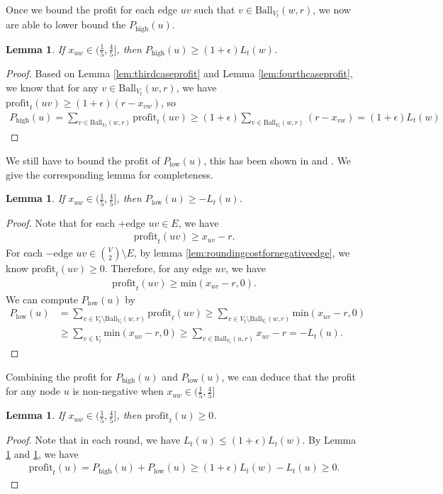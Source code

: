 \documentclass[11pt]{article}
\newtheorem{lemma}[theorem]{Lemma}
\newcommand{\ball}{\mathrm{Ball}}
\newcommand{\profit}{\mathrm{profit}}
\newcommand{\onefive}{\frac{1}{5}}
\newcommand{\fourfive}{\frac{4}{5}}
\begin{document}
\begin{CJK*}{UTF8}{gbsn}
Once we bound the profit for each edge $uv$ such that $v \in \ball_{V_t}(w, r)$, we now are able to lower bound the $P_{\textrm{high}}(u)$.

\begin{lemma}
\label{lem:highprofit}
If $x_{uw} \in (\onefive, \fourfive]$, then $P_{\textrm{high}}(u) \geq (1 + \epsilon) L_t(w)$.
\end{lemma}
\begin{proof}
Based on Lemma \ref{lem:thirdcaseprofit} and Lemma \ref{lem:fourthcaseprofit}, we know that for any $v \in \ball_{V_t}(w, r)$, we have $\profit_{t}(uv) \geq (1 + \epsilon)(r - x_{vw})$, so 
\begin{align*}
    P_{\textrm{high}}(u) = \sum_{v \in \ball_{V_t}(w, r)}\profit_t(uv) \geq (1 + \epsilon) \sum_{v \in \ball_{V_t}(w, r)}(r - x_{vw}) = (1 + \epsilon) L_t(w)
\end{align*}
\end{proof}
We still have to bound the profit of $P_{\textrm{low}}(u)$, this has been shown in \cite{kalhan2019correlation} and \cite{davies2023fast}. We give the corresponding lemma for completeness. 
\begin{lemma}
\label{lem:lowprofit}
If $x_{uw} \in (\onefive, \fourfive]$, then $P_{\textrm{low}}(u) \geq - L_t(u)$.
\end{lemma}
\begin{proof}
    Note that for each $+$edge $uv \in E$, we have 
\begin{align*}
    \profit_t(uv) \geq x_{uv} - r.
\end{align*}
For each $-$edge $uv \in {V \choose 2} \setminus E$, by lemma \ref{lem:roundingcostfornegativeedge}, we know $\profit_t(uv) \geq 0$. Therefore, for any edge $uv$, we have 
\begin{align*}
    \profit_t(uv) \geq \textrm{min}(x_{uv} - r, 0).
\end{align*}
We can compute $P_{\textrm{low}}(u)$ by
\begin{align*}
    P_{\textrm{low}}(u) &= \sum_{v \in V_t \setminus \ball_{V_t}(w, r)}\profit_t(uv) \geq \sum_{v \in V_t \setminus \ball_{V_t}(w, r)} \textrm{min}(x_{uv} - r, 0) \\
    &\geq \sum_{v \in V_t} \textrm{min}(x_{uv} - r, 0) \geq \sum_{v \in \ball_{V_t}(u, r)} x_{uv} - r = -L_t(u).
\end{align*}
\end{proof}

Combining the profit for $P_{\textrm{high}}(u)$ and $P_{\textrm{low}}(u)$, we can deduce that the profit for any node $u$ is non-negative when $ x_{uw} \in (\onefive, \fourfive]$
\begin{lemma}
If $x_{uw} \in (\onefive, \fourfive]$, then $\profit_t(u) \geq 0$.
\end{lemma}
\begin{proof}
    Note that in each round, we have $L_t(u) \leq (1 + \epsilon) L_t(w)$. By Lemma \ref{lem:highprofit} and \ref{lem:lowprofit}, we have 
\begin{align*}
    \profit_t(u) = P_{\textrm{high}}(u) + P_{\textrm{low}}(u) \geq (1 + \epsilon)L_t(w) - L_t(u) \geq 0.
\end{align*}
\end{proof}


\end{CJK*}
\end{document}
